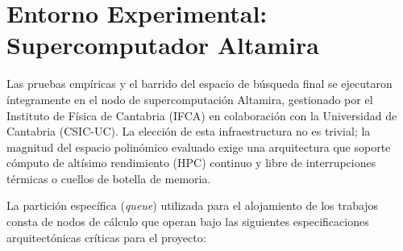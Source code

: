 \documentclass[12pt,a4paper]{tfg_domingo}
\begin{document}
\section{Entorno Experimental: Supercomputador Altamira}

Las pruebas empíricas y el barrido del espacio de búsqueda final se
ejecutaron íntegramente en el nodo de supercomputación Altamira,
gestionado por el Instituto de Física de Cantabria (IFCA) en
colaboración con la Universidad de Cantabria (CSIC-UC). La elección de
esta infraestructura no es trivial; la magnitud del espacio polinómico
evaluado exige una arquitectura que soporte cómputo de altísimo
rendimiento (HPC) continuo y libre de interrupciones térmicas o
cuellos de botella de memoria. 

La partición específica (\emph{queue}) utilizada para el alojamiento de los trabajos consta de nodos de cálculo que operan bajo las siguientes especificaciones arquitectónicas críticas para el proyecto:
\end{document}
